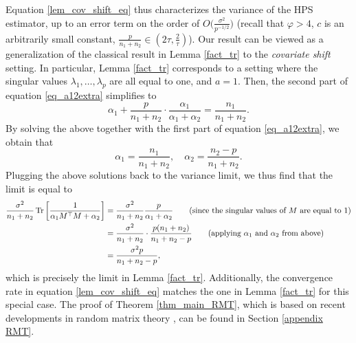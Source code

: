 Equation \eqref{lem_cov_shift_eq} thus characterizes the variance of the HPS estimator, up to an error term on the order of $O\big(\frac{\sigma^2}{p^{-1/2}}\big)$ (recall that $\varphi > 4$, $c$ is an arbitrarily small constant, $\frac{p}{n_1+n_2} \in (2 {\tau}, \frac 2 {\tau})$).
Our result can be viewed as a generalization of the classical result in Lemma \ref{fact_tr} to the \textit{covariate shift} setting.
In particular, Lemma \ref{fact_tr} corresponds to a setting where the singular values $\lambda_1,\dots,\lambda_p$ are all equal to one, and $a = 1$. Then, the second part of equation \eqref{eq_a12extra} simplifies to
\[ \alpha_1 + \frac{p}{n_1 + n_2}\cdot \frac{\alpha_1}{\alpha_1 + \alpha_2} = \frac{n_1}{n_1 + n_2}. \]
By solving the above together with the first part of equation \eqref{eq_a12extra}, we obtain that
$$\alpha_1 = \frac{n_1}{n_1+n_2},\quad \alpha_2 = \frac{n_2-p}{n_1+ n_2}.$$
Plugging the above solutions back to the variance limit, we thus find that the limit is equal to
\begin{align*}
    \frac{\sigma^2}{n_1 + n_2} \bigtr{\frac 1 {\alpha_1 M^{\top} M + \alpha_2}} &= \frac{\sigma^2}{n_1 + n_2} \frac{p}{\alpha_1 + \alpha_2} \tag{since the singular values of $M$ are equal to $1$} \\
    &= \frac{\sigma^2}{n_1 + n_2} \cdot\frac{p (n_1 + n_2)}{n_1 + n_2 - p} \tag{applying $\alpha_1$ and $\alpha_2$ from above} \\
    &= \frac{\sigma^2 p}{n_1 + n_2 - p},
\end{align*}
which is precisely the limit in Lemma \ref{fact_tr}.
Additionally, the convergence rate in equation \eqref{lem_cov_shift_eq} matches the one in Lemma \ref{fact_tr} for this special case.
The proof of Theorem \ref{thm_main_RMT}, which is based on recent developments in random matrix theory \cite{Anisotropic}, can be found in Section \ref{appendix RMT}.

